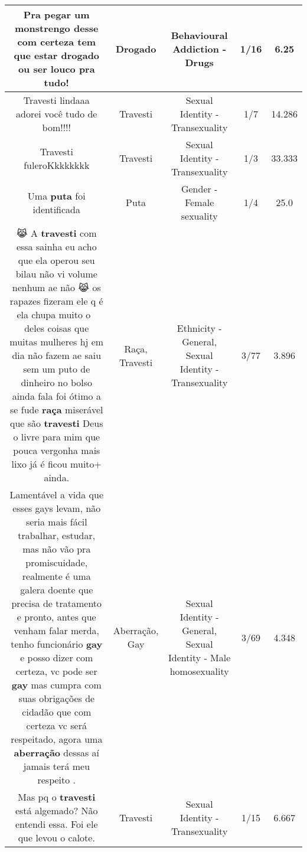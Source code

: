 \documentclass[11pt]{article}
\newlength\mylength
\begin{document}
\begin{center}
\begin{longtable}{|C{.65\mylength}|C{.30\mylength}|C{.12\mylength}|C{.12\mylength}|C{.12\mylength}|}
  \small Pra pegar um monstrengo desse com certeza tem que estar \textbf{drogado} ou ser louco pra tudo!\normalsize   & Drogado & Behavioural Addiction - Drugs & 1/16 & 6.25 \\  \hline
  \small Travesti lindaaa adorei você tudo de bom!!!!\normalsize   & Travesti & Sexual Identity - Transexuality & 1/7 & 14.286 \\  \hline
  \small Travesti fuleroKkkkkkkk\normalsize   & Travesti & Sexual Identity - Transexuality & 1/3 & 33.333 \\  \hline
  \small Uma \textbf{puta} foi identificada\normalsize   & Puta & Gender - Female sexuality & 1/4 & 25.0 \\  \hline
  \small 😹 A \textbf{travesti} com essa sainha eu acho que ela operou seu bilau não vi volume nenhum ae não 😹 os rapazes fizeram ele q é ela chupa muito o 🍭 deles  coisas que muitas mulheres hj em dia não fazem ae saiu sem um puto de dinheiro no bolso ainda fala foi ótimo a se fude \textbf{raça} miserável que são \textbf{travesti} Deus o livre para mim que pouca vergonha mais lixo já é ficou muito+ ainda.\normalsize   & Raça, Travesti & Ethnicity - General, Sexual Identity - Transexuality & 3/77 & 3.896 \\  \hline
  \small Lamentável a vida que esses gays  levam, não seria mais fácil  trabalhar, estudar, mas não vão pra promiscuidade, realmente é uma galera doente que precisa de tratamento e pronto, antes que venham falar merda, tenho funcionário \textbf{gay} e posso dizer com certeza, vc pode ser \textbf{gay} mas cumpra com suas obrigações de cidadão que com certeza vc será respeitado, agora uma \textbf{aberração} dessas aí jamais terá meu respeito .\normalsize   & Aberração, Gay & Sexual Identity - General, Sexual Identity - Male homosexuality & 3/69 & 4.348 \\  \hline
  \small Mas pq o \textbf{travesti} está algemado? Não entendi essa. Foi ele que levou o calote.\normalsize   & Travesti & Sexual Identity - Transexuality & 1/15 & 6.667 \\  \hline

\end{longtable}
\end{center}
\end{document}

